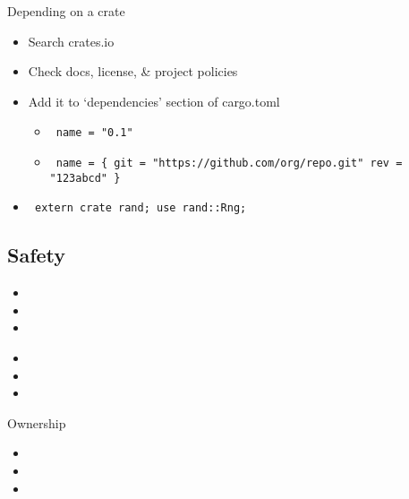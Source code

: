 \documentclass[50pt]{beamer}
\begin{document}
    \begin{frame}
        Depending on a crate
        \begin{itemize}
            \item Search crates.io
            \item Check docs, license, \& project policies
            \item Add it to `dependencies' section of cargo.toml
            \begin{itemize}
                \item \begin{verbatim} name = "0.1"\end{verbatim}
                \item \begin{verbatim} name = { git = "https://github.com/org/repo.git" rev = "123abcd" } \end{verbatim}
            \end{itemize}
            \item \begin{verbatim} extern crate rand; use rand::Rng;\end{verbatim}
        \end{itemize}
    \end{frame}

\subsection{Safety}

    \begin{frame}
        \begin{itemize}
            \item
            \item
            \item
        \end{itemize}
    \end{frame}


    \begin{frame}
        \begin{itemize}
            \item
            \item
            \item
        \end{itemize}
    \end{frame}

    \begin{frame}
        Ownership
        \begin{itemize}
            \item
            \item
            \item
        \end{itemize}
    \end{frame}
\end{document}
